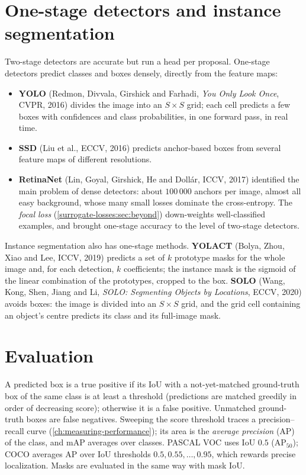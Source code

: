 \begin{notechapter}
\section{One-stage detectors and instance segmentation}\label{detection-segmentation:sec:onestage}

Two-stage detectors are accurate but run a head per proposal. One-stage detectors predict
classes and boxes densely, directly from the feature maps:
\begin{itemize}
  \item \textbf{YOLO} (Redmon, Divvala, Girshick and Farhadi, \emph{You Only Look Once},
        CVPR, 2016) divides the image into an $S\times S$ grid; each cell predicts a few boxes with
        confidences and class probabilities, in one forward pass, in real time.
  \item \textbf{SSD} (Liu et al., ECCV, 2016) predicts anchor-based boxes from several feature maps of
        different resolutions.
  \item \textbf{RetinaNet} (Lin, Goyal, Girshick, He and Dollár, ICCV, 2017) identified the main
        problem of dense detectors: about $100\,000$ anchors per image, almost all easy background,
        whose many small losses dominate the cross-entropy. The \emph{focal loss}
        (\cref{surrogate-losses:sec:beyond}) down-weights well-classified examples, and brought
        one-stage accuracy to the level of two-stage detectors.
\end{itemize}
Instance segmentation also has one-stage methods. \textbf{YOLACT} (Bolya, Zhou, Xiao and Lee,
ICCV, 2019) predicts a set of $k$ prototype masks for the whole image and, for each detection, $k$
coefficients; the instance mask is the sigmoid of the linear combination of the prototypes,
cropped to the box. \textbf{SOLO} (Wang, Kong, Shen, Jiang and Li, \emph{SOLO: Segmenting
Objects by Locations}, ECCV, 2020) avoids boxes: the image is divided into an $S\times S$ grid, and the
grid cell containing an object's centre predicts its class and its full-image mask.

\section{Evaluation}\label{detection-segmentation:sec:evaluation}

A predicted box is a true positive if its IoU with a not-yet-matched ground-truth box of the
same class is at least a threshold (predictions are matched greedily in order of decreasing
score); otherwise it is a false positive. Unmatched ground-truth boxes are false negatives.
Sweeping the score threshold traces a precision--recall curve (\cref{ch:measuring-performance});
its area is the \emph{average precision} (AP) of the class, and mAP averages over classes. PASCAL VOC
uses IoU $0.5$ (AP$_{50}$); COCO averages AP over IoU thresholds $0.5, 0.55,\dots,0.95$, which rewards precise
localization. Masks are evaluated in the same way with mask IoU.


\end{notechapter}
